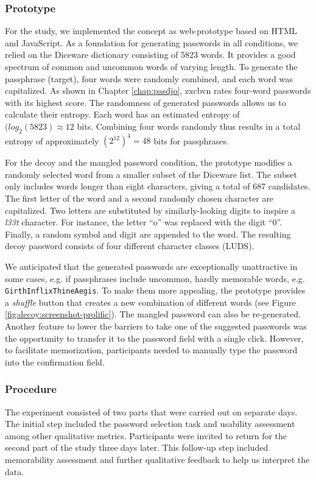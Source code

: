 \subsubsection{Prototype}
For the study, we implemented the concept as web-prototype based on HTML and JavaScript. As a foundation for  generating passwords in all conditions, we relied on the Diceware dictionary consisting of 5823 words. It provides a good spectrum of common and uncommon words of varying length. To generate the passphrase (target), four words were randomly combined, and each word was capitalized. As shown in Chapter \ref{chap:pasdjo}, zxcbvn rates four-word passwords with its highest score. The randomness of generated passwords allows us to calculate their entropy. Each word has an estimated entropy of $(log_2(5823) \approx 12$ bits. Combining four words randomly thus results in a total entropy of approximately $ (2^{12})^4 = 48$ bits for passphrases.

For the decoy and the mangled password condition, the prototype modifies a randomly selected word from a smaller subset of the Diceware list. The subset only includes words longer than eight characters, giving a total of 687 candidates. The first letter of the word and a second randomly chosen character are capitalized. Two letters are substituted by similarly-looking digits to inspire a \textit{l33t} character. For instance, the letter ``o'' was replaced with the digit ``0''. Finally, a random symbol and digit are appended to the word. The resulting decoy password consists of four different character classes (LUDS). 

We anticipated that the generated passwords are exceptionally unattractive in some cases, e.g. if passphrases include uncommon, hardly memorable words, e.g. \texttt{GirthInflixThineAegis}. To make them more appealing, the prototype provides a \textit{shuffle} button that creates a new combination of different words (see Figure \ref{fig:decoy:screenshot-prolific}). The mangled password can also be re-generated. Another feature to lower the barriers to take one of the suggested passwords was the opportunity to transfer it to the password field with a single click. However, to facilitate memorization, participants needed to manually type the password into the confirmation field. 

\subsubsection{Procedure}
The experiment consisted of two parts that were carried out on separate days. The initial step included the password selection task and usability assessment among other qualitative metrics. Participants were invited to return for the second part of the study three days later. This follow-up step included memorability assessment and further qualitative feedback to help us interpret the data.


